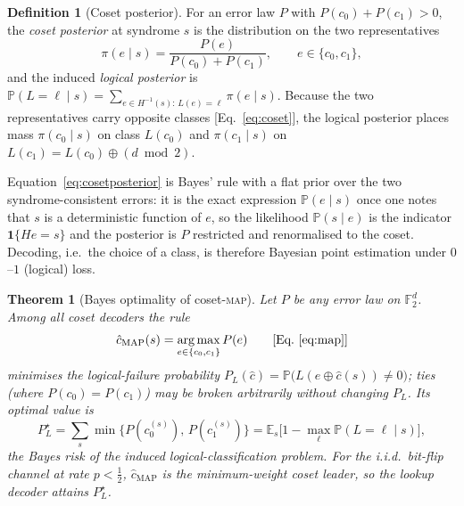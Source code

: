 \documentclass[reprint,aps,prxquantum,amsmath,amssymb,floatfix,nofootinbib,longbibliography]{revtex4-2}
\newtheorem{theorem}{Theorem}
\theoremstyle{definition}
\newtheorem{definition}{Definition}
\theoremstyle{remark}
\theoremstyle{plain}
\DeclareMathOperator*{\argmax}{arg\,max}
\newcommand{\F}{\mathbb{F}}
\newcommand{\E}{\mathbb{E}}
\newcommand{\PP}{\mathbb{P}}
\begin{document}
\begin{definition}[Coset posterior]
\label{def:posterior}
For an error law $P$ with $P(c_0)+P(c_1)>0$, the \emph{coset posterior} at
syndrome $s$ is the distribution on the two representatives
\begin{equation}
  \pi(e\mid s)=\frac{P(e)}{P(c_0)+P(c_1)},\qquad e\in\{c_0,c_1\},
  \label{eq:cosetposterior}
\end{equation}
and the induced \emph{logical posterior} is
$\PP(L=\ell\mid s)=\sum_{e\in H^{-1}(s):\,L(e)=\ell}\pi(e\mid s)$. Because the
two representatives carry opposite classes [Eq.~\eqref{eq:coset}], the logical
posterior places mass $\pi(c_0\mid s)$ on class $L(c_0)$ and $\pi(c_1\mid s)$ on
$L(c_1)=L(c_0)\oplus(d\bmod2)$.
\end{definition}

Equation~\eqref{eq:cosetposterior} is Bayes' rule with a flat prior over the
two syndrome-consistent errors: it is the exact expression $\PP(e\mid s)$ once
one notes that $s$ is a deterministic function of $e$, so the likelihood
$\PP(s\mid e)$ is the indicator $\mathbf 1\{He=s\}$ and the posterior is $P$
restricted and renormalised to the coset. Decoding, i.e.\ the choice of a
class, is therefore Bayesian point estimation under $0$--$1$ (logical) loss.

\begin{theorem}[Bayes optimality of coset-\textsc{map}]
\label{thm:bayes}
Let $P$ be any error law on $\F_2^d$. Among all coset decoders the rule
\begin{equation}
  \hat c_{\mathrm{MAP}}(s)=\argmax_{e\in\{c_0,c_1\}}P(e)
  \qquad\text{[Eq.~\eqref{eq:map}]}
\end{equation}
minimises the logical-failure probability
$P_L(\hat c)=\PP\bigl(L(e\oplus\hat c(s))\neq0\bigr)$; ties (where
$P(c_0)=P(c_1)$) may be broken arbitrarily without changing $P_L$. Its optimal
value is
\begin{equation}
  P_L^\star=\sum_{s}\min\bigl\{P(c_0^{(s)}),\,P(c_1^{(s)})\bigr\}
        =\E_s\bigl[1-\max_{\ell}\PP(L=\ell\mid s)\bigr],
  \label{eq:bayesrisk}
\end{equation}
the Bayes risk of the induced logical-classification problem. For the i.i.d.\
bit-flip channel at rate $p<\tfrac12$, $\hat c_{\mathrm{MAP}}$ is the
minimum-weight coset leader, so the lookup decoder attains $P_L^\star$.
\end{theorem}
\end{document}
